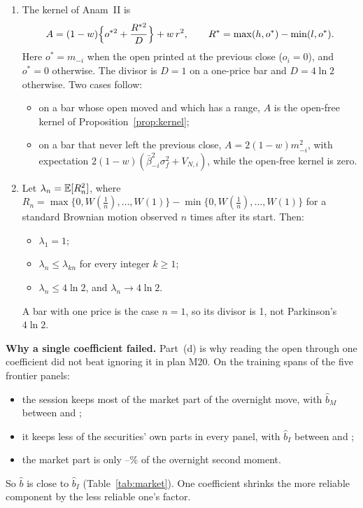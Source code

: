 \begin{proposition}
\begin{enumerate}[label=(\alph*)]
        $\hat\mu$ the sample counterparts.
  \item The kernel of Anam~II is
        \[
          A=(1-w)\Bigl\{o^{*2}+\frac{R^{*2}}{D}\Bigr\}+w\,r^2,\qquad R^*=\max(h,o^*)-\min(l,o^*).
        \]
        Here $o^*=m_{-i}$ when the open printed at the previous close ($o_i=0$), and $o^*=0$ otherwise.
        The divisor is $D=1$ on a one-price bar and $D=4\ln2$ otherwise. Two cases follow:
        \begin{itemize}
          \item on a bar whose open moved and which has a range, $A$ is the open-free kernel of
                Proposition~\ref{prop:kernel};
          \item on a bar that never left the previous close, $A=2(1-w)m_{-i}^2$, with expectation
                $2(1-w)(\bar\beta_{-i}^2\sigma_f^2+V_{N,i})$, while the open-free kernel is zero.
        \end{itemize}
  \item Let $\lambda_n=\mathbb{E}[R_n^2]$, where $R_n=\max\{0,W(\tfrac1n),\dots,W(1)\}-\min\{0,W(\tfrac1n),\dots,W(1)\}$
        for a standard Brownian motion observed $n$ times after its start. Then:
        \begin{itemize}
          \item $\lambda_1=1$;
          \item $\lambda_n\le\lambda_{kn}$ for every integer $k\ge1$;
          \item $\lambda_n\le4\ln2$, and $\lambda_n\to4\ln2$.
        \end{itemize}
        A bar with one price is the case $n=1$, so its divisor is 1, not Parkinson's $4\ln2$.
\end{enumerate}
\end{proposition}

\textbf{Why a single coefficient failed.} Part~(d) is why reading the open through one coefficient did
not beat ignoring it in plan M20. On the training spans of the five frontier panels:
\begin{itemize}
  \item the session keeps most of the market part of the overnight move, with $\hat b_M$
        between  and ;
  \item it keeps less of the securities' own parts in every panel, with $\hat b_I$ between
         and ;
  \item the market part is only --\% of the overnight second moment.
\end{itemize}
So $\hat b$ is close to $\hat b_I$ (Table~\ref{tab:market}). One coefficient shrinks the more reliable
component by the less reliable one's factor.


